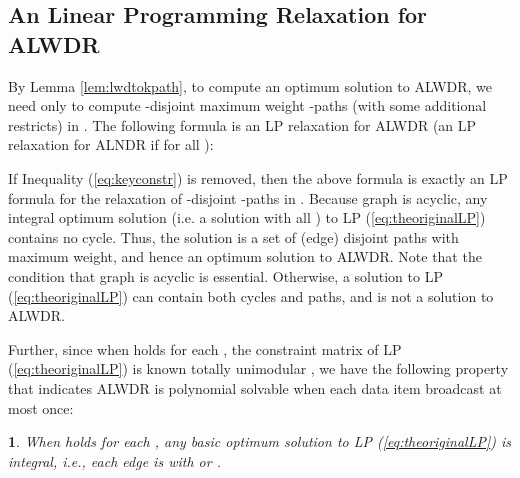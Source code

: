 \documentclass[11pt,english,onecolumn,draftcls]{IEEEtran}
\theoremstyle{plain}
\newtheorem{thm}{\protect\theoremname}
\theoremstyle{plain}
\theoremstyle{plain}
\theoremstyle{plain}
\providecommand{\theoremname}{Theorem}
\begin{document}
\subsection{An Linear Programming Relaxation for ALWDR }

By Lemma \ref{lem:lwdtokpath}, to compute an optimum solution to
ALWDR, we need only to compute -disjoint maximum
weight -paths (with some additional restricts) in . The following
formula is an LP relaxation for ALWDR (an LP relaxation for
ALNDR if  for all ):




If Inequality (\ref{eq:keyconstr}) is removed, then the above formula
is exactly an LP formula for the relaxation of -disjoint
-paths in . Because graph  is acyclic, any integral optimum
solution (i.e. a solution with all ) to LP (\ref{eq:theoriginalLP})
contains no cycle. Thus, the solution is a set of (edge) disjoint
paths with maximum weight, and hence an optimum solution to ALWDR.
Note that the condition that graph  is acyclic is essential. Otherwise,
a solution to LP (\ref{eq:theoriginalLP}) can contain both cycles
and paths, and is not a solution to ALWDR.

Further, since when  holds for each ,
the constraint matrix of LP (\ref{eq:theoriginalLP}) is known totally
unimodular \cite{schrijver1998theory}, we have the following property
that indicates ALWDR is polynomial solvable when each data
item broadcast at most once:
\begin{thm}
\label{Thr:LWDR-is-polynomial-1} When  holds
for each , any basic optimum solution to LP (\ref{eq:theoriginalLP})
is integral, i.e., each edge  is with  or .
\end{thm}
\end{document}
